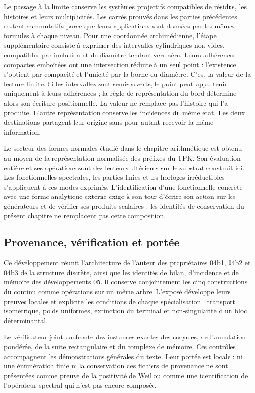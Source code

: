 Le passage à la limite conserve les systèmes projectifs compatibles de résidus, les histoires et leurs multiplicités. Les carrés prouvés dans les parties précédentes restent commutatifs parce que leurs applications sont données par les mêmes formules à chaque niveau. Pour une coordonnée archimédienne, l’étape supplémentaire consiste à exprimer des intervalles cylindriques non vides, compatibles par inclusion et de diamètre tendant vers zéro. Leurs adhérences compactes emboîtées ont une intersection réduite à un seul point : l’existence s’obtient par compacité et l’unicité par la borne du diamètre. C’est la valeur de la lecture limite. Si les intervalles sont semi-ouverts, le point peut appartenir uniquement à leurs adhérences ; la règle de représentation du bord détermine alors son écriture positionnelle. La valeur ne remplace pas l’histoire qui l’a produite. L’autre représentation conserve les incidences du même état. Les deux destinations partagent leur origine sans pour autant recevoir la même information.

Le secteur des formes normales étudié dans le chapitre arithmétique est obtenu au moyen de la représentation normalisée des préfixes du TPK. Son évaluation entière et ses opérations sont des lecteurs ultérieurs sur le substrat construit ici. Les fonctionnelles spectrales, les parties finies et les horloges irréductibles s'appliquent à ces modes exprimés. L'identification d'une fonctionnelle concrète avec une forme analytique externe exige à son tour d'écrire son action sur les générateurs et de vérifier ses produits scalaires : les identités de conservation du présent chapitre ne remplacent pas cette composition.

\clearpage
\subsection{Provenance, vérification et portée}
Ce développement réunit l’architecture de l’auteur des propriétaires 04b1, 04b2 et 04b3 de la structure discrète, ainsi que les identités de bilan, d’incidence et de mémoire des développements 05. Il conserve conjointement les cinq constructions du continu comme opérations sur un même arbre. L’exposé développe leurs preuves locales et explicite les conditions de chaque spécialisation : transport isométrique, poids uniformes, extinction du terminal et non-singularité d’un bloc déterminantal.

Le vérificateur joint confronte des instances exactes des cocycles, de l’annulation pondérée, de la suite rectangulaire et du complexe de mémoire. Ces contrôles accompagnent les démonstrations générales du texte. Leur portée est locale : ni une énumération finie ni la conservation des fichiers de provenance ne sont présentées comme preuve de la positivité de Weil ou comme une identification de l’opérateur spectral qui n’est pas encore composée.
